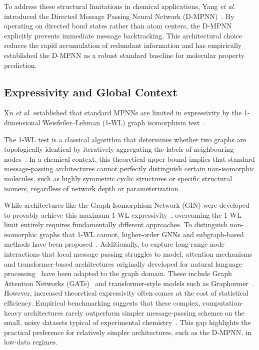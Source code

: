 To address these structural limitations in chemical applications, Yang \textit{et al.} introduced the Directed Message Passing Neural Network (D-MPNN)~\cite{yang2019analyzing}. By operating on directed bond states rather than atom centers, the D-MPNN explicitly prevents immediate message backtracking.  This architectural choice reduces the rapid accumulation of redundant information and has empirically established the D-MPNN as a robust standard baseline for molecular property prediction.

\subsection{Expressivity and Global Context}
Xu \textit{et al.} established that standard MPNNs are limited in expressivity by the 1-dimensional Weisfeiler--Lehman (1-WL) graph isomorphism test~\cite{xu2018powerful, morris2019weisfeiler}.

The 1-WL test is a classical algorithm that determines whether two graphs are topologically identical by iteratively aggregating the labels of neighbouring nodes~\cite{weisfeiler1968ve}. In a chemical context, this theoretical upper bound implies that standard message-passing architectures cannot perfectly distinguish certain non-isomorphic molecules, such as highly symmetric cyclic structures or specific structural isomers, regardless of network depth or parameterization.

While architectures like the Graph Isomorphism Network (GIN) were developed to provably achieve this maximum 1-WL expressivity~\cite{xu2018powerful}, overcoming the 1-WL limit entirely requires fundamentally different approaches. To distinguish non-isomorphic graphs that 1-WL cannot, higher-order GNNs and subgraph-based methods have been proposed~\cite{morris2019weisfeiler, bodnar2021weisfeiler}. Additionally, to capture long-range node interactions that local message passing struggles to model, attention mechanisms and transformer-based architectures originally developed for natural language processing~\cite{vaswani2017attention} have been adapted to the graph domain. These include Graph Attention Networks (GATs)~\cite{velivckovic2017graph} and transformer-style models such as Graphormer~\cite{ying2021transformers}. However, increased theoretical expressivity often comes at the cost of statistical efficiency. Empirical benchmarking suggests that these complex, computation-heavy architectures rarely outperform simpler message-passing schemes on the small, noisy datasets typical of experimental chemistry~\cite{rampavsek2022recipe}. This gap highlights the practical preference for relatively simpler architectures, such as the D-MPNN, in low-data regimes.

